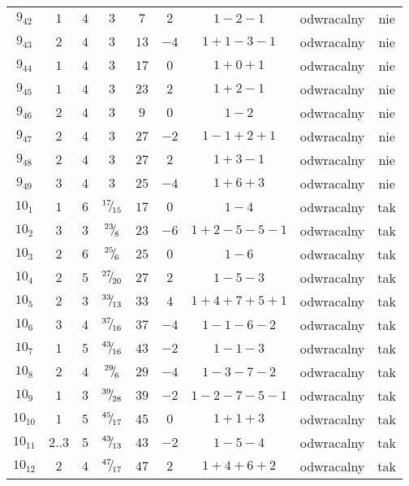 \begin{longtable}{ccccccccc}
$9_{42}$ & $1$ & $4$ & $3$ & $7$ & $2$ & $1-2-1$ & odwracalny & nie \\
$9_{43}$ & $2$ & $4$ & $3$ & $13$ & $-4$ & $1+1-3-1$ & odwracalny & nie \\
$9_{44}$ & $1$ & $4$ & $3$ & $17$ & $0$ & $1+0+1$ & odwracalny & nie \\
$9_{45}$ & $1$ & $4$ & $3$ & $23$ & $2$ & $1+2-1$ & odwracalny & nie \\
$9_{46}$ & $2$ & $4$ & $3$ & $9$ & $0$ & $1-2$ & odwracalny & nie \\
$9_{47}$ & $2$ & $4$ & $3$ & $27$ & $-2$ & $1-1+2+1$ & odwracalny & nie \\
$9_{48}$ & $2$ & $4$ & $3$ & $27$ & $2$ & $1+3-1$ & odwracalny & nie \\
$9_{49}$ & $3$ & $4$ & $3$ & $25$ & $-4$ & $1+6+3$ & odwracalny & nie \\
$10_{1}$ & $1$ & $6$ & ${}^{17}{\mskip -5mu/\mskip -3mu}_{15}$ & $17$ & $0$ & $1-4$ & odwracalny & tak \\
$10_{2}$ & $3$ & $3$ & ${}^{23}{\mskip -5mu/\mskip -3mu}_{8}$ & $23$ & $-6$ & $1+2-5-5-1$ & odwracalny & tak \\
$10_{3}$ & $2$ & $6$ & ${}^{25}{\mskip -5mu/\mskip -3mu}_{6}$ & $25$ & $0$ & $1-6$ & odwracalny & tak \\
$10_{4}$ & $2$ & $5$ & ${}^{27}{\mskip -5mu/\mskip -3mu}_{20}$ & $27$ & $2$ & $1-5-3$ & odwracalny & tak \\
$10_{5}$ & $2$ & $3$ & ${}^{33}{\mskip -5mu/\mskip -3mu}_{13}$ & $33$ & $4$ & $1+4+7+5+1$ & odwracalny & tak \\
$10_{6}$ & $3$ & $4$ & ${}^{37}{\mskip -5mu/\mskip -3mu}_{16}$ & $37$ & $-4$ & $1-1-6-2$ & odwracalny & tak \\
$10_{7}$ & $1$ & $5$ & ${}^{43}{\mskip -5mu/\mskip -3mu}_{16}$ & $43$ & $-2$ & $1-1-3$ & odwracalny & tak \\
$10_{8}$ & $2$ & $4$ & ${}^{29}{\mskip -5mu/\mskip -3mu}_{6}$ & $29$ & $-4$ & $1-3-7-2$ & odwracalny & tak \\
$10_{9}$ & $1$ & $3$ & ${}^{39}{\mskip -5mu/\mskip -3mu}_{28}$ & $39$ & $-2$ & $1-2-7-5-1$ & odwracalny & tak \\
$10_{10}$ & $1$ & $5$ & ${}^{45}{\mskip -5mu/\mskip -3mu}_{17}$ & $45$ & $0$ & $1+1+3$ & odwracalny & tak \\
$10_{11}$ & $2..3$ & $5$ & ${}^{43}{\mskip -5mu/\mskip -3mu}_{13}$ & $43$ & $-2$ & $1-5-4$ & odwracalny & tak \\
$10_{12}$ & $2$ & $4$ & ${}^{47}{\mskip -5mu/\mskip -3mu}_{17}$ & $47$ & $2$ & $1+4+6+2$ & odwracalny & tak \\

\end{longtable}
